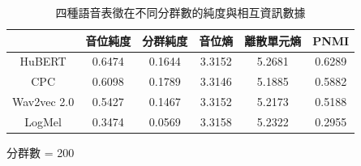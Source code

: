 {\begin{table}[!htbp]
    \begin{subtable}[t]{\textwidth}
        \centering
        \begin{tabular}{|c|c|c|c|c|c|} \hline
                        & 音位純度   & 分群純度   & 音位熵    & 離散單元熵  & PNMI   \\ \hline
            HuBERT      &     0.6474 &     0.1644 &    3.3152 &      5.2681 & 0.6289 \\ \hline    %
            CPC         &     0.6098 &     0.1789 &    3.3146 &      5.1885 & 0.5882 \\ \hline    %
            Wav2vec 2.0 &     0.5427 &     0.1467 &    3.3152 &      5.2173 & 0.5188 \\ \hline    %
            LogMel      &     0.3474 &     0.0569 &    3.3158 &      5.2322 & 0.2955 \\ \hline    %
        \end{tabular}
        \caption{分群數 = 200}
        \label{tab:ch3-clu200-phn}
    \end{subtable}

    \caption{四種語音表徵在不同分群數的純度與相互資訊數據}
    \label{tab:single-cluster-results}
\end{table}

}  %
